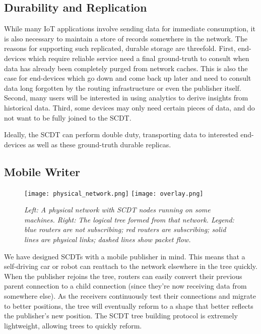 \subsection{Durability and Replication}
\label{durability-replication}

While many IoT applications involve sending data for immediate consumption, it is also necessary to maintain a store of records somewhere in the network.  The reasons for supporting such replicated, durable storage are threefold.  First, end-devices which require reliable service need a final ground-truth to consult when data has already been completely purged from network caches.  This is also the case for end-devices which go down and come back up later and need to consult data long forgotten by the routing infrastructure or even the publisher itself.  Second, many users will be interested in using analytics to derive insights from historical data.  Third, some devices may only need certain pieces of data, and do not want to be fully joined to the SCDT.

Ideally, the SCDT can perform double duty, transporting data to interested end-devices as well as these ground-truth durable replicas.

\subsection{Mobile Writer}
\label{mobile-writer}
\begin{figure}[t]
	\begin{center}
		\texttt{[image: physical\_network.png]}
		\texttt{[image: overlay.png]}
	\end{center}
	\vspace{-1.3em}
	\caption{\small \itshape Left: A physical network with SCDT nodes running on some machines.  Right: The logical tree formed from that network.  Legend: blue routers are not subscribing; red routers are subscribing; solid lines are physical links; dashed lines show packet flow.}
	\vspace{-1em}
	\label{fig:multicast-tree}
\end{figure}
We have designed SCDTs with a mobile publisher in mind. This means that a self-driving car or robot can reattach to the network elsewhere in the tree quickly. When the publisher rejoins the tree, routers can easily convert their previous parent connection to a child connection (since they're now receiving data from somewhere else). As the receivers continuously test their connections and migrate to better positions, the tree will eventually reform to a shape that better reflects the publisher's new position. The SCDT tree building protocol is extremely lightweight, allowing trees to quickly reform.

